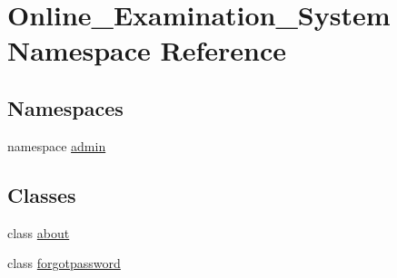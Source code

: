 \hypertarget{namespace_online___examination___system}{}\section{Online\+\_\+\+Examination\+\_\+\+System Namespace Reference}
\label{namespace_online___examination___system}
\subsection*{Namespaces}
\begin{DoxyCompactItemize}
\item 
namespace \mbox{\hyperlink{namespace_online___examination___system_1_1admin}{admin}}
\end{DoxyCompactItemize}
\subsection*{Classes}
\begin{DoxyCompactItemize}
\item 
class \mbox{\hyperlink{class_online___examination___system_1_1about}{about}}
\item 
class \mbox{\hyperlink{class_online___examination___system_1_1forgotpassword}{forgotpassword}}
\end{DoxyCompactItemize}
